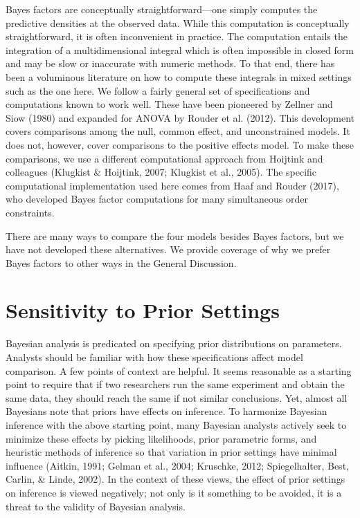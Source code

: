 \documentclass[english,man]{apa6}
\theoremstyle{definition}
\theoremstyle{definition}
\theoremstyle{definition}
\theoremstyle{remark}
\begin{document}
Bayes factors are conceptually straightforward---one simply computes the
predictive densities at the observed data. While this computation is
conceptually straightforward, it is often inconvenient in practice. The
computation entails the integration of a multidimensional integral which
is often impossible in closed form and may be slow or inaccurate with
numeric methods. To that end, there has been a voluminous literature on
how to compute these integrals in mixed settings such as the one here.
We follow a fairly general set of specifications and computations known
to work well. These have been pioneered by Zellner and Siow (1980) and
expanded for ANOVA by Rouder et al. (2012). This development covers
comparisons among the null, common effect, and unconstrained models. It
does not, however, cover comparisons to the positive effects model. To
make these comparisons, we use a different computational approach from
Hoijtink and colleagues (Klugkist \& Hoijtink, 2007; Klugkist et al.,
2005). The specific computational implementation used here comes from
Haaf and Rouder (2017), who developed Bayes factor computations for many
simultaneous order constraints.

There are many ways to compare the four models besides Bayes factors,
but we have not developed these alternatives. We provide coverage of why
we prefer Bayes factors to other ways in the General Discussion.

\section{Sensitivity to Prior
Settings}\label{sensitivity-to-prior-settings}

Bayesian analysis is predicated on specifying prior distributions on
parameters. Analysts should be familiar with how these specifications
affect model comparison. A few points of context are helpful. It seems
reasonable as a starting point to require that if two researchers run
the same experiment and obtain the same data, they should reach the same
if not similar conclusions. Yet, almost all Bayesians note that priors
have effects on inference. To harmonize Bayesian inference with the
above starting point, many Bayesian analysts actively seek to minimize
these effects by picking likelihoods, prior parametric forms, and
heuristic methods of inference so that variation in prior settings have
minimal influence (Aitkin, 1991; Gelman et al., 2004; Kruschke, 2012;
Spiegelhalter, Best, Carlin, \& Linde, 2002). In the context of these
views, the effect of prior settings on inference is viewed negatively;
not only is it something to be avoided, it is a threat to the validity
of Bayesian analysis.
\end{document}
